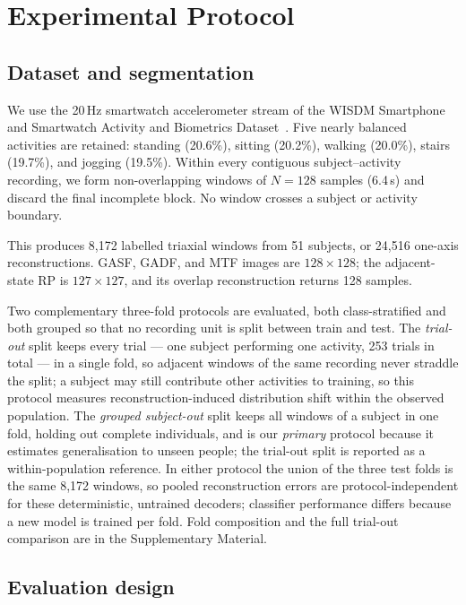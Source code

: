 \documentclass[preprint,12pt]{elsarticle}
\begin{document}
\section{Experimental Protocol}\label{sec:experimental_protocol}

\subsection{Dataset and segmentation}

We use the 20\,Hz smartwatch accelerometer stream of the WISDM Smartphone and Smartwatch Activity and Biometrics Dataset~\cite{misc_wisdm_smartphone_and_smartwatch_activity_and_biometrics_dataset__507}. Five nearly balanced activities are retained: standing (20.6\%), sitting (20.2\%), walking (20.0\%), stairs (19.7\%), and jogging (19.5\%). Within every contiguous subject--activity recording, we form non-overlapping windows of \(N=128\) samples (6.4\,s) and discard the final incomplete block. No window crosses a subject or activity boundary.

This produces 8,172 labelled triaxial windows from 51 subjects, or 24,516 one-axis reconstructions. GASF, GADF, and MTF images are \(128\times128\); the adjacent-state RP is \(127\times127\), and its overlap reconstruction returns 128 samples.

Two complementary three-fold protocols are evaluated, both class-stratified and both grouped so that no recording unit is split between train and test. The \emph{trial-out} split keeps every trial --- one subject performing one activity, 253 trials in total --- in a single fold, so adjacent windows of the same recording never straddle the split; a subject may still contribute other activities to training, so this protocol measures reconstruction-induced distribution shift within the observed population. The \emph{grouped subject-out} split keeps all windows of a subject in one fold, holding out complete individuals, and is our \emph{primary} protocol because it estimates generalisation to unseen people; the trial-out split is reported as a within-population reference. In either protocol the union of the three test folds is the same 8,172 windows, so pooled reconstruction errors are protocol-independent for these deterministic, untrained decoders; classifier performance differs because a new model is trained per fold. Fold composition and the full trial-out comparison are in the Supplementary Material.

\subsection{Evaluation design}
\end{document}
